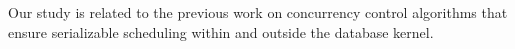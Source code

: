 
Our study is related to the previous work on concurrency control algorithms that ensure serializable scheduling within and outside the database kernel.


